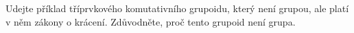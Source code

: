 Udejte příklad tříprvkového komutativního grupoidu, který není grupou, ale platí
v něm zákony o krácení. Zdůvodněte, proč tento grupoid není grupa.
